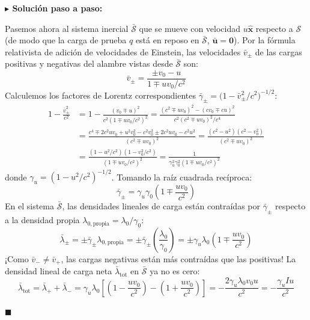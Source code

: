 \documentclass[11pt,a4paper]{book}
\newenvironment{solucion}{%
    \par\medskip\noindent\textbf{\color{blue!65!black}\Large $\blacktriangleright$ Solución paso a paso:}\par\medskip
}{%
    \hfill$\blacksquare$\par\bigskip
}
\newcommand{\xhat}{\hat{\bm{x}}}
\begin{document}
\begin{solucion}
Pasemos ahora al sistema inercial $\bar{\mathcal{S}}$ que se mueve con velocidad $u\xhat$ respecto a $\mathcal{S}$ (de modo que la carga de prueba $q$ está en reposo en $\bar{\mathcal{S}}$, $\bar{\bm{u}} = \bm{0}$). Por la fórmula relativista de adición de velocidades de Einstein, las velocidades $\bar{v}_\pm$ de las cargas positivas y negativas del alambre vistas desde $\bar{\mathcal{S}}$ son:
\begin{equation}
    \bar{v}_\pm = \frac{\pm v_0 - u}{1 \mp u v_0 / c^2}
\end{equation}
Calculemos los factores de Lorentz correspondientes $\bar{\gamma}_\pm = \big(1 - \bar{v}_\pm^2/c^2\big)^{-1/2}$:
\begin{align}
    1 - \frac{\bar{v}_\pm^2}{c^2} &= 1 - \frac{(v_0 \mp u)^2}{c^2(1 \mp u v_0 / c^2)^2} = \frac{(c^2 \mp u v_0)^2 - (c v_0 \mp c u)^2}{c^2(c^2 \mp u v_0)^2 / c^4} \nonumber \\
    &= \frac{c^4 \mp 2c^2 u v_0 + u^2 v_0^2 - c^2 v_0^2 \pm 2c^2 u v_0 - c^2 u^2}{(c^2 \mp u v_0)^2} = \frac{(c^2 - u^2)(c^2 - v_0^2)}{(c^2 \mp u v_0)^2} \nonumber \\
    &= \frac{(1 - u^2/c^2)(1 - v_0^2/c^2)}{(1 \mp u v_0 / c^2)^2} = \frac{1}{\gamma_u^2 \gamma_0^2 (1 \mp u v_0 / c^2)^2}
\end{align}
donde $\gamma_u = (1 - u^2/c^2)^{-1/2}$. Tomando la raíz cuadrada recíproca:
\begin{equation}
    \bar{\gamma}_\pm = \gamma_u \gamma_0 \left(1 \mp \frac{u v_0}{c^2}\right)
\end{equation}
En el sistema $\bar{\mathcal{S}}$, las densidades lineales de carga están contraídas por $\bar{\gamma}_\pm$ respecto a la densidad propia $\lambda_{0,\text{propia}} = \lambda_0 / \gamma_0$:
\begin{equation}
    \bar{\lambda}_\pm = \pm \bar{\gamma}_\pm \lambda_{0,\text{propia}} = \pm \bar{\gamma}_\pm \left(\frac{\lambda_0}{\gamma_0}\right) = \pm \gamma_u \lambda_0 \left(1 \mp \frac{u v_0}{c^2}\right)
\end{equation}
¡Como $\bar{v}_- \neq \bar{v}_+$, las cargas negativas están más contraídas que las positivas! La densidad lineal de carga neta $\bar{\lambda}_{\text{tot}}$ en $\bar{\mathcal{S}}$ ya no es cero:
\begin{equation}
    \bar{\lambda}_{\text{tot}} = \bar{\lambda}_+ + \bar{\lambda}_- = \gamma_u \lambda_0 \left[ \left(1 - \frac{u v_0}{c^2}\right) - \left(1 + \frac{u v_0}{c^2}\right) \right] = -\frac{2 \gamma_u \lambda_0 v_0 u}{c^2} = -\frac{\gamma_u I u}{c^2}
\end{equation}

\end{solucion}
\end{document}

